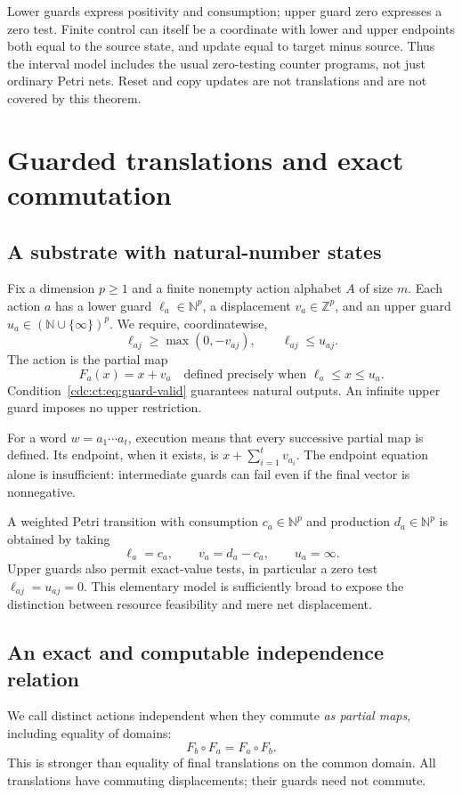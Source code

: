 \documentclass[11pt,a4paper]{article}
\theoremstyle{definition}
\theoremstyle{remark}
\newcommand{\N}{\mathbb N}
\newcommand{\Z}{\mathbb Z}
\newcommand{\srctag}[1]{\texorpdfstring{\hspace{0.5em}{\normalfont\small\color{accent}[#1]}}{ [#1]}}
\begin{document}
Lower guards express positivity and consumption; upper guard zero expresses a zero test. Finite control can itself be a coordinate with lower and upper endpoints both equal to the source state, and update equal to target minus source. Thus the interval model includes the usual zero-testing counter programs, not just ordinary Petri nets. Reset and copy updates are not translations and are not covered by this theorem.


\section{Guarded translations and exact commutation\srctag{01}}\label{cdc:ct:sec:actions}
\subsection{A substrate with natural-number states}
Fix a dimension $p\ge1$ and a finite nonempty action alphabet $A$ of size $m$. Each action $a$ has a lower guard $\ell_a\in\N^p$, a displacement $v_a\in\Z^p$, and an upper guard $u_a\in(\N\cup\{\infty\})^p$. We require, coordinatewise,
\begin{equation}\label{cdc:ct:eq:guard-valid}
 \ell_{aj}\ge\max(0,-v_{aj}),\qquad \ell_{aj}\le u_{aj}.
\end{equation}
The action is the partial map
\begin{equation}\label{cdc:ct:eq:action}
 F_a(x)=x+v_a\quad\text{defined precisely when }\ell_a\le x\le u_a.
\end{equation}
Condition~\eqref{cdc:ct:eq:guard-valid} guarantees natural outputs. An infinite upper guard imposes no upper restriction.

For a word $w=a_1\cdots a_t$, execution means that every successive partial map is defined. Its endpoint, when it exists, is
$x+\sum_{i=1}^t v_{a_i}$. The endpoint equation alone is insufficient: intermediate guards can fail even if the final vector is nonnegative.

A weighted Petri transition with consumption $c_a\in\N^p$ and production $d_a\in\N^p$ is obtained by taking
\[
 \ell_a=c_a,\qquad v_a=d_a-c_a,\qquad u_a=\infty.
\]
Upper guards also permit exact-value tests, in particular a zero test $\ell_{aj}=u_{aj}=0$. This elementary model is sufficiently broad to expose the distinction between resource feasibility and mere net displacement.

\subsection{An exact and computable independence relation}
We call distinct actions independent when they commute \emph{as partial maps}, including equality of domains:
\begin{equation}\label{cdc:ct:eq:commute}
 F_b\circ F_a=F_a\circ F_b.
\end{equation}
This is stronger than equality of final translations on the common domain. All translations have commuting displacements; their guards need not commute.
\end{document}
